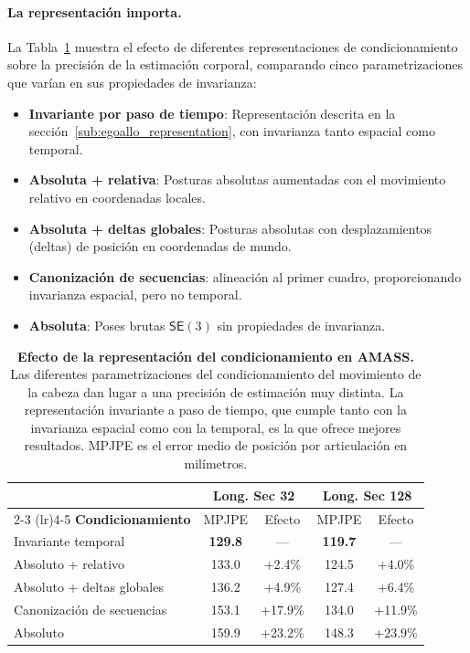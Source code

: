 \documentclass[../../book-main_es.tex]{subfiles}
\begin{document}
\paragraph{La representación importa.}
La Tabla~\ref{tab:egoallo_cond_ablation} muestra el efecto de diferentes
representaciones de condicionamiento sobre la precisión de la estimación corporal, comparando
cinco parametrizaciones que varían en sus propiedades de invarianza:
\begin{itemize}
    \item \textbf{Invariante por paso de tiempo}: Representación
        descrita en la sección~\ref{sub:egoallo_representation}, con
        invarianza tanto espacial como temporal.
    \item \textbf{Absoluta + relativa}: Posturas absolutas aumentadas con
        el movimiento relativo en coordenadas locales.
    \item \textbf{Absoluta + deltas globales}: Posturas absolutas con
        desplazamientos (deltas) de posición en coordenadas de mundo.
    \item \textbf{Canonización de secuencias}: alineación al primer
        cuadro, proporcionando invarianza espacial, pero no temporal.
    \item \textbf{Absoluta}: Poses brutas $\mathsf{SE}(3)$ sin propiedades de invarianza.
\end{itemize}

\begin{table}[htbp]
    \centering
    \caption{\textbf{Efecto de la representación del condicionamiento en AMASS.}
        Las diferentes parametrizaciones del condicionamiento del movimiento de la cabeza dan lugar a
        una precisión de estimación muy distinta. La representación
        invariante a paso de tiempo, que cumple tanto con la invarianza espacial como
        con la temporal, es la que ofrece mejores resultados. MPJPE es el error medio de posición por articulación
    en milímetros.}
    \label{tab:egoallo_cond_ablation}
    \small
    \begin{tabular}{lcccc}
        \toprule
        & \multicolumn{2}{c}{\textbf{Long. Sec 32}} &
        \multicolumn{2}{c}{\textbf{Long. Sec 128}} \\
        \cmidrule(lr){2-3} \cmidrule(lr){4-5}
        \textbf{Condicionamiento} & MPJPE & Efecto & MPJPE & Efecto \\
        \midrule
        Invariante temporal & \textbf{129.8} & --- & \textbf{119.7} & --- \\
        Absoluto + relativo & 133.0 & +2.4\% & 124.5 & +4.0\% \\
        Absoluto + deltas globales & 136.2 & +4.9\% & 127.4 & +6.4\% \\
        Canonización de secuencias & 153.1 & +17.9\% & 134.0 & +11.9\% \\
        Absoluto & 159.9 & +23.2\% & 148.3 & +23.9\% \\
        \bottomrule
    \end{tabular}
\end{table}
\end{document}
